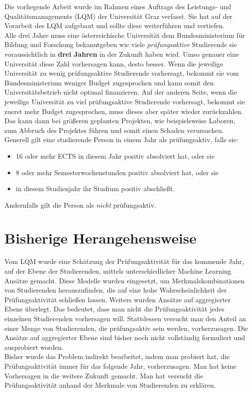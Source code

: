 


Die vorliegende Arbeit wurde im Rahmen eines Auftrags des Leistungs- und Qualit\"atsmanagements (LQM) der
Universität Graz verfasst. Sie hat auf der Vorarbeit des LQM aufgebaut und sollte diese weiterf\"uhren
und vertiefen. \\

Alle drei Jahre muss eine \"osterreichische Universität dem Bundesministerium f\"ur Bildung und Forschung
bekanntgeben wie viele \textit{pr\"ufungsaktive} Studierende sie voraussichtlich in \textbf{drei Jahren}
in der Zukunft haben wird. Umso genauer eine Universität diese Zahl vorhersagen kann, desto besser.
Wenn die jeweilige Universität zu wenig pr\"ufungsaktive Studierende vorhersagt, bekommt sie vom Bundesministerium
weniger Budget zugesprochen und kann somit den Universitätsbetrieb nicht optimal finanzieren. Auf der anderen Seite,
wenn die jeweilige Universität zu viel pr\"ufungsaktive Studierende vorhersagt, bekommt sie zuerst mehr Budget zugesprochen,
muss dieses aber sp\"ater wieder zur\"uckzahlen. Das kann dann bei gr\"o{\ss}eren geplanten Projekten, wie beispielsweise Laboren,
zum Abbruch des Projektes f\"uhren und somit einen Schaden verursachen. \\

\noindent Generell gilt eine studierende Person in einem Jahr als pr\"ufungsaktiv, falls sie:

\begin{itemize}
    \item 16 oder mehr ECTS in diesem Jahr positiv absolviert hat, oder sie
    \item 8 oder mehr Semesterwochenstunden positiv absolviert hat, oder sie
    \item in diesem Studienjahr ihr Studium positiv abschlie{\ss}t.
\end{itemize}
Andernfalls gilt die Person als \textit{nicht} pr\"ufungsaktiv. \\





\section{Bisherige Herangehensweise}


Vom LQM wurde eine Sch\"atzung der Pr\"ufungsaktivit\"at f\"ur das kommende Jahr, auf der Ebene der Studierenden,
mittels unterschiedlicher Machine Learning Ans\"atze gemacht. Diese Modelle wurden eingesetzt, um Merkmalskombinationen von Studierenden herauszufinden,
die auf eine hohe Wahrscheinlichkeit der Pr\"ufungsaktivit\"at schlie{\ss}en lassen.
Weiters wurden Ans\"atze auf aggregierter Ebene \"uberlegt. Das bedeutet, dass man nicht die Pr\"ufungsaktivit\"at jedes einzelnen Studierenden vorhersagen will. Stattdessen
versucht man den Anteil an einer Menge von Studierenden, die pr\"ufungsaktiv sein werden, vorherzusagen.
Die Ans\"atze auf aggregierter Ebene sind bisher noch nicht vollst\"andig formuliert und ausprobiert worden. \\


Bisher wurde das Problem indirekt bearbeitet, indem man probiert hat, die Pr\"ufungsaktivit\"at
immer f\"ur das folgende Jahr, vorherzusagen. Man hat keine Vorhersagen in die weitere Zukunft gemacht.
Man hat versucht die Pr\"ufungsaktivit\"at anhand der Merkmale von Studierenden zu erkl\"aren. \\

